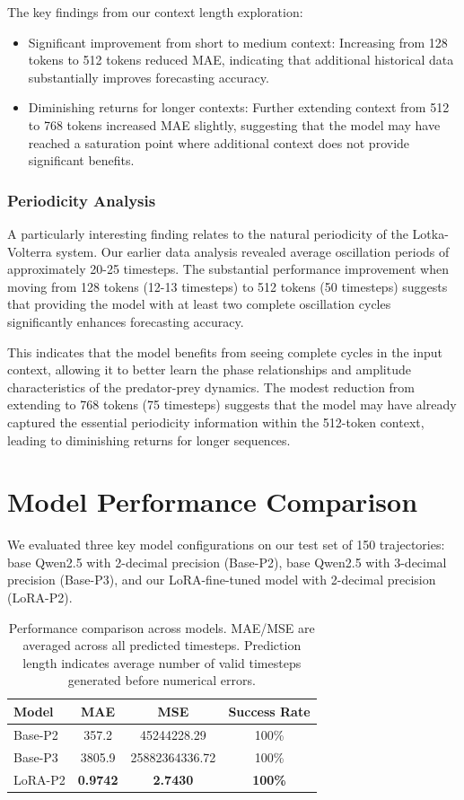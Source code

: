 \documentclass{article}
\begin{document}
The key findings from our context length exploration:
\begin{itemize}
    \item Significant improvement from short to medium context: Increasing from 128 tokens to 512 tokens reduced MAE, indicating that additional historical data substantially improves forecasting accuracy.
    \item Diminishing returns for longer contexts: Further extending context from 512 to 768 tokens increased MAE slightly, suggesting that the model may have reached a saturation point where additional context does not provide significant benefits.
\end{itemize}
\subsubsection*{Periodicity Analysis}
A particularly interesting finding relates to the natural periodicity of the Lotka-Volterra system. Our earlier data analysis revealed average oscillation periods of approximately 20-25 timesteps. The substantial performance improvement when moving from 128 tokens (12-13 timesteps) to 512 tokens (50 timesteps) suggests that providing the model with at least two complete oscillation cycles significantly enhances forecasting accuracy.

This indicates that the model benefits from seeing complete cycles in the input context, allowing it to better learn the phase relationships and amplitude characteristics of the predator-prey dynamics. The modest reduction from extending to 768 tokens (75 timesteps) suggests that the model may have already captured the essential periodicity information within the 512-token context, leading to diminishing returns for longer sequences.


\section*{Model Performance Comparison}

We evaluated three key model configurations on our test set of 150 trajectories: base Qwen2.5 with 2-decimal precision (Base-P2), base Qwen2.5 with 3-decimal precision (Base-P3), and our LoRA-fine-tuned model with 2-decimal precision (LoRA-P2).


\begin{table}[H]
\centering
\begin{tabular}{lccc}
\hline
\textbf{Model} & \textbf{MAE} & \textbf{MSE} & \textbf{Success Rate}  \\
\hline
Base-P2 & 357.2 & 45244228.29 & 100\%  \\
Base-P3 & 3805.9 & 25882364336.72 & 100\% \\
LoRA-P2 & \textbf{0.9742} & \textbf{2.7430} & \textbf{100\%} \\
\hline
\end{tabular}
\caption{Performance comparison across models. MAE/MSE are averaged across all predicted timesteps. Prediction length indicates average number of valid timesteps generated before numerical errors.}
\label{tab:model_comparison}
\end{table}
\end{document}
